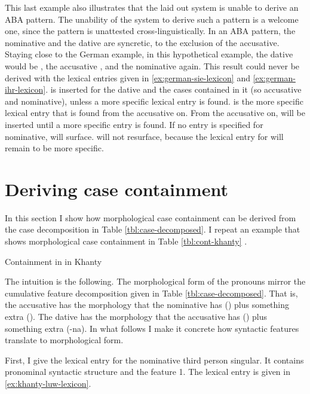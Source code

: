 This last example also illustrates that the laid out system is unable to derive an ABA pattern. The unability of the system to derive such a pattern is a welcome one, since the pattern is unattested cross-linguistically. In an ABA pattern, the nominative and the dative are syncretic, to the exclusion of the accusative. Staying close to the German example, in this hypothetical example, the dative would be , the accusative , and the nominative  again.
This result could never be derived with the lexical entries given in \ref{ex:german-sie-lexicon} and \ref{ex:german-ihr-lexicon}.  is inserted for the dative and the cases contained in it (so accusative and nominative), unless a more specific lexical entry is found.  is the more specific lexical entry that is found from the accusative on. From the accusative on,  will be inserted until a more specific entry is found. If no entry is specified for nominative,  will surface.  will not resurface, because the lexical entry for  will remain to be more specific.


\section{Deriving case containment}

In this section I show how morphological case containment can be derived from the case decomposition in Table \ref{tbl:case-decomposed}. I repeat an example that shows morphological case containment in Table \ref{tbl:cont-khanty} .

\begin{table}[ht]
  \center
  \caption {Containment in  in Khanty}
    
  \label{tbl:cont-khanty-3sg}
\end{table}

The intuition is the following. The morphological form of the pronouns mirror the cumulative feature decomposition given in Table \ref{tbl:case-decomposed}. That is, the accusative has the morphology that the nominative has () plus something extra (). The dative has the morphology that the accusative has () plus something extra (-na). In what follows I make it concrete how syntactic features translate to morphological form.

First, I give the lexical entry for the nominative third person singular. It contains pronominal syntactic structure and the feature 1. The lexical entry is given in \ref{ex:khanty-luw-lexicon}.


